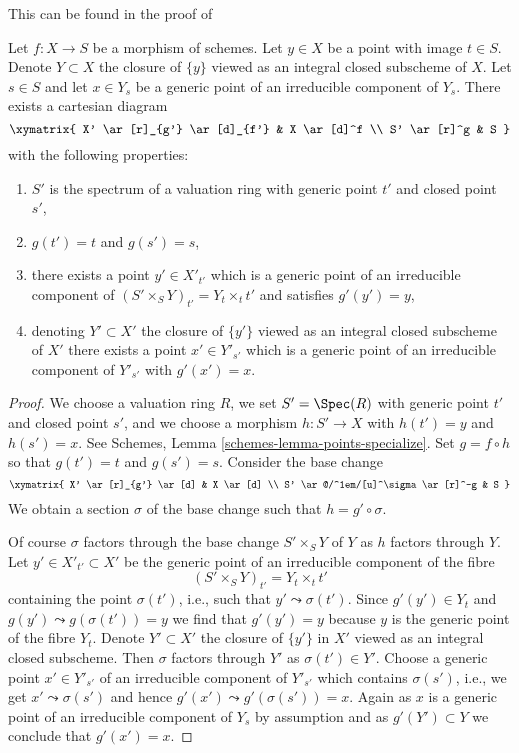 \begin{lemma}
\label{lemma-make-base-change}
\begin{reference}
This can be found in the proof of
\cite[IV Proposition 12.1.1.5]{EGA}
\end{reference}
Let $f : X \to S$ be a morphism of schemes. Let $y \in X$ be a point
with image $t \in S$. Denote $Y \subset X$ the closure of $\{y\}$
viewed as an integral closed subscheme of $X$. Let $s \in S$ and let
$x \in Y_s$ be a generic point of an irreducible component of $Y_s$.
There exists a cartesian diagram
$$
\xymatrix{
X' \ar[r]_{g'} \ar[d]_{f'} & X \ar[d]^f \\
S' \ar[r]^g & S
}
$$
with the following properties:
\begin{enumerate}
\item $S'$ is the spectrum of a valuation ring
with generic point $t'$ and closed point $s'$,
\item $g(t') = t$ and $g(s') = s$,
\item there exists a point $y' \in X'_{t'}$ which is
a generic point of an irreducible component of
$(S' \times_S Y)_{t'} = Y_t \times_t t'$
and satisfies $g'(y') = y$,
\item denoting $Y' \subset X'$ the closure of $\{y'\}$
viewed as an integral closed subscheme of $X'$
there exists a point $x' \in Y'_{s'}$ which is a generic
point of an irreducible component of $Y'_{s'}$
with $g'(x') = x$.
\end{enumerate}
\end{lemma}

\begin{proof}
We choose a valuation ring $R$, we set $S' = \Spec(R)$ with
generic point $t'$ and closed point $s'$, and we choose a morphism
$h : S' \to X$ with $h(t') = y$ and $h(s') = x$.
See Schemes, Lemma \ref{schemes-lemma-points-specialize}.
Set $g = f \circ h$ so that $g(t') = t$ and $g(s') = s$.
Consider the base change
$$
\xymatrix{
X' \ar[r]_{g'} \ar[d] & X \ar[d] \\
S' \ar@/^1em/[u]^\sigma \ar[r]^-g & S
}
$$
We obtain a section $\sigma$ of the base change such that
$h = g' \circ \sigma$.

\medskip\noindent
Of course $\sigma$ factors through the base change $S' \times_S Y$ of $Y$
as $h$ factors through $Y$. Let $y' \in X'_{t'} \subset X'$ be the
generic point of an irreducible component of the fibre
$$
(S' \times_S Y)_{t'} = Y_t \times_t t'
$$
containing the point $\sigma(t')$, i.e., such that
$y' \leadsto \sigma(t')$.
Since $g'(y') \in Y_t$ and $g(y') \leadsto g(\sigma(t')) = y$
we find that $g'(y') = y$ because $y$ is the generic point of
the fibre $Y_t$.
Denote $Y' \subset X'$ the closure of $\{y'\}$ in $X'$ viewed
as an integral closed subscheme.
Then $\sigma$ factors through $Y'$ as $\sigma(t') \in Y'$.
Choose a generic point $x' \in Y'_{s'}$ of an irreducible
component of $Y'_{s'}$ which contains $\sigma(s')$, i.e., we
get $x' \leadsto \sigma(s')$ and hence $g'(x') \leadsto g'(\sigma(s')) = x$.
Again as $x$ is a generic point of an irreducible component of $Y_s$
by assumption
and as $g'(Y') \subset Y$ we conclude that $g'(x') = x$.
\end{proof}

